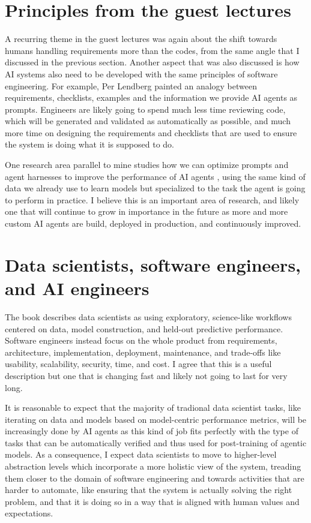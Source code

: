 \documentclass[11pt,a4paper]{article}
\begin{document}
\section{Principles from the guest lectures}

A recurring theme in the guest lectures was again about the shift towards humans handling requirements more than the codes, from the same angle that I discussed in the previous section.
Another aspect that was also discussed is how AI systems also need to be developed with the same principles of software engineering.
For example, Per Lendberg painted an analogy between requirements, checklists, examples and the information we provide AI agents as prompts.
Engineers are likely going to spend much less time reviewing code, which will be generated and validated as automatically as possible, and much more time on designing the requirements and checklists that are used to ensure the system is doing what it is supposed to do.

One research area parallel to mine studies how we can optimize prompts and agent harnesses to improve the performance of AI agents \cite{agrawal2026gepa}, using the same kind of data we already use to learn models but specialized to the task the agent is going to perform in practice.
I believe this is an important area of research, and likely one that will continue to grow in importance in the future as more and more custom AI agents are build, deployed in production, and continuously improved.

\section{Data scientists, software engineers, and AI engineers}

The book describes data scientists as using exploratory, science-like workflows centered on data, model construction, and held-out predictive performance. Software engineers instead focus on the whole product from requirements, architecture, implementation, deployment, maintenance, and trade-offs like usability, scalability, security, time, and cost.
I agree that this is a useful description but one that is changing fast and likely not going to last for very long.

It is reasonable to expect that the majority of tradional data scientist tasks, like iterating on data and models based on model-centric performance metrics, will be increasingly done by AI agents as this kind of job fits perfectly with the type of tasks that can be automatically verified and thus used for post-training of agentic models.
As a consequence, I expect data scientists to move to higher-level abstraction levels which incorporate a more holistic view of the system, treading them closer to the domain of software engineering and towards activities that are harder to automate, like ensuring that the system is actually solving the right problem, and that it is doing so in a way that is aligned with human values and expectations.
\end{document}
